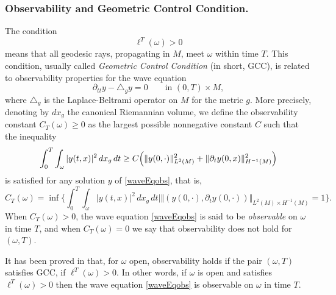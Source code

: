 \documentclass[JEP,XML,SOM,Unicode, NoEqCountersInSection,NoFloatCountersInSection,published]{cedram}
\theoremstyle{definition}
\begin{document}
\subsubsection*{Observability and Geometric Control Condition.}
The condition
\[
\ell^T(\omega)>0
\]
means that all geodesic rays, propagating in $M$, meet $\omega$ within time $T$. This condition, usually called \textit{Geometric Control Condition} (in short, GCC), is related to observability properties for the wave equation
\begin{equation}\label{waveEqobs}
\partial_{tt}y- \triangle_g y=0\qquad \textrm{in }(0,T)\times M,
\end{equation}
where $\triangle_g$ is the Laplace-Beltrami operator on $M$ for the metric $g$.
More precisely, denoting by $dx_g$ the canonical Riemannian volume, we define the observability constant $C_T(\omega)\geq 0$ as the largest possible nonnegative constant $C$ such that the inequality
\begin{equation} \label{ineqobsw}
\int_0^T \int_\omega |y(t,x)|^2 \, dx_g \, dt \geq C \Bigl( \Vert y(0,\cdot)\Vert_{L^2(M)}^2 + \Vert\partial_t y(0,x)\Vert_{H^{-1}(M)}^2 \Bigr)
\end{equation}
is satisfied for any solution $y$ of \eqref{waveEqobs}, that is,
\[
C_T(\omega) = \inf \biggl\{ \int_0^T \int_\omega | y(t,x)|^2 \, dx_g \, dt \mid \Vert (y(0,\cdot),\partial_t y(0,\cdot))\Vert_{L^2(M)\times H^{-1}(M)}=1 \biggr\}.
\]
When $C_T(\omega)>0$, the wave equation \eqref{waveEqobs} is said to be \textit{observable} on $\omega$ in time $T$, and when $C_T(\omega)=0$ we say that observability does not hold for $(\omega,T)$.

It has been proved in \cite{BardosLebeauRauch,rauch-taylor} that, for $\omega$ open, observability holds if the pair $(\omega,T)$ satisfies GCC, \ie if $\ell^T(\omega)>0$.
In other words, if $\omega$ is open and satisfies $\ell^T(\omega)>0$ then the wave equation \eqref{waveEqobs} is observable on $\omega$ in time $T$.
\end{document}
